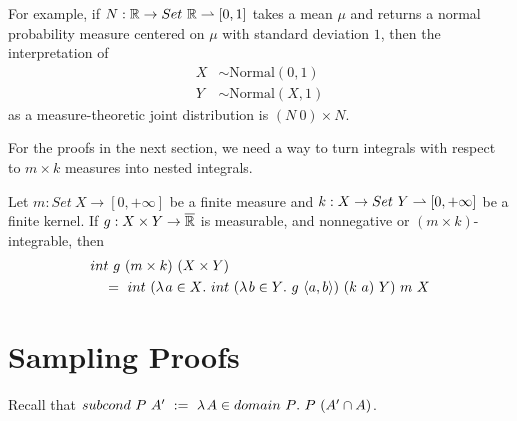 For example, if $N : \mathbb{R} \to Set~\mathbb{R} \rightharpoonup [0,1]$ takes a mean $\mu$ and returns a normal probability measure centered on $\mu$ with standard deviation $1$, then the interpretation of
\begin{equation}
\begin{aligned}
	X &\sim \mathrm{Normal}(0,1)
\\
	Y &\sim \mathrm{Normal}(X,1)
\end{aligned}
\end{equation}
as a measure-theoretic joint distribution is $(N~0) \times N$.

For the proofs in the next section, we need a way to turn integrals with respect to $m \times k$ measures into nested integrals.

\begin{lemma}
\label{lem:fubini-for-transition-kernels}
Let $m : Set~X \to [0,+\infty]$ be a finite measure and $k : X \to Set~Y \rightharpoonup [0,+\infty]$ be a finite kernel.
If $g : X \times Y \to \cl{\Re}$ is measurable, and nonnegative or $(m \times k)$-integrable, then
\begin{equation}
\begin{aligned}
	&int~g~(m \times k)~(X \times Y)
\\
	&\tab =\ 
	int~(\fun{a \in X} int~(\fun{b \in Y} g~\pair{a,b})~(k~a)~Y)~m~X
\end{aligned}
\end{equation}
\end{lemma}


\section{Sampling Proofs}
\label{sec:sampling-proofs}

Recall that $subcond~P~A'\ :=\ \lambda\mspace{2mu}{A \in domain~P}\ldotp\, P~(A' \cap A)$.

